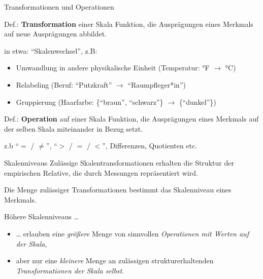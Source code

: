 \documentclass[
  10pt,
  ignorenonframetext,
]{beamer}
\providecommand{\tightlist}{%
  \setlength{\itemsep}{0pt}\setlength{\parskip}{0pt}}
\begin{document}
\begin{frame}{Transformationen und Operationen}
\protect\hypertarget{transformationen-und-operationen}{}
\begin{block}{Def.: \textbf{Transformation} einer Skala}
\protect\hypertarget{def.-transformation-einer-skala}{}
Funktion, die Ausprägungen eines Merkmals auf neue Ausprägungen
abbildet.
\end{block}

in etwa: ``Skalenwechsel'', z.B:

\begin{itemize}
\tightlist
\item
  Umwandlung in andere physikalische Einheit (Temperatur: °F \(\to\) °C)
\item
  Relabeling (Beruf: ``Putzkraft'' \(\to\) ``Raumpfleger*in'')
\item
  Gruppierung (Haarfarbe: \{``braun'', ``schwarz''\} \(\to\)
  \{``dunkel''\})
\end{itemize}

\begin{block}{Def.: \textbf{Operation} auf einer Skala}
\protect\hypertarget{def.-operation-auf-einer-skala}{}
Funktion, die Ausprägungen eines Merkmals auf der selben Skala
miteinander in Bezug setzt.
\end{block}

z.b ``\(=\) / \(\neq\)'', ``\(>\) / \(=\) / \(<\)'', Differenzen,
Quotienten etc.
\end{frame}

\begin{frame}{Skalenniveaus}
\protect\hypertarget{skalenniveaus-1}{}
Zulässige Skalentransformationen erhalten die Struktur der empirischen
Relative, die durch Messungen repräsentiert wird.

Die Menge zulässiger Transformationen bestimmt das Skalenniveau eines
Merkmals.

Höhere Skalenniveaus \ldots{}

\begin{itemize}
\tightlist
\item
  \ldots{} erlauben eine \emph{größere} Menge von sinnvollen
  \emph{Operationen mit Werten auf der Skala},
\item
  aber nur eine \emph{kleinere} Menge an zulässigen strukturerhaltenden
  \emph{Transformationen der Skala selbst}.
\end{itemize}
\end{frame}
\end{document}
